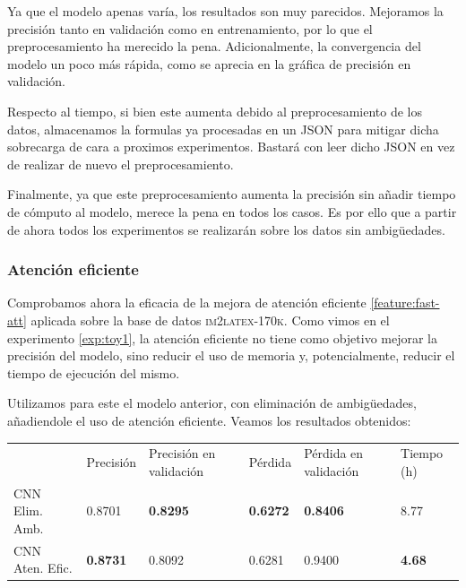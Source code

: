 \documentclass[a4paper, 20pt, dvipsnames]{article}
\begin{document}
Ya que el modelo apenas varía, los resultados son muy parecidos. Mejoramos la
precisión tanto en validación como en entrenamiento, por lo que el preprocesamiento
ha merecido la pena. Adicionalmente, la convergencia del modelo un poco más rápida,
como se aprecia en la gráfica de precisión en validación.

Respecto al tiempo, si bien este aumenta debido al preprocesamiento de los datos,
almacenamos la formulas ya procesadas en un JSON para mitigar dicha sobrecarga de
cara a proximos experimentos. Bastará con leer dicho JSON en vez de realizar de
nuevo el preprocesamiento.

Finalmente, ya que este preprocesamiento aumenta la precisión sin añadir tiempo de
cómputo al modelo, merece la pena en todos los casos. Es por ello que a partir de
ahora todos los experimentos se realizarán sobre los datos sin ambigüedades.

\subsubsection{Atención eficiente}
\label{exp:3a}

Comprobamos ahora la eficacia de la mejora de atención eficiente
\ref{feature:fast-att} aplicada sobre la base de datos
\textsc{im2latex-170k}. Como vimos en el experimento \ref{exp:toy1}, la atención
eficiente no tiene como objetivo mejorar la precisión del modelo, sino reducir
el uso de memoria y, potencialmente, reducir el tiempo de ejecución del mismo.

Utilizamos para este el modelo anterior, con eliminación de ambigüedades,
añadiendole el uso de atención eficiente. Veamos los resultados obtenidos:

\begin{table}[H]
	\centering
	\begin{tabular}{llllll}
		& Precisión       & Precisión en validación & Pérdida         & Pérdida en validación & Tiempo (h)    \\ \cline{2-6} 
		CNN Elim. Amb.  & 0.8701          & \textbf{0.8295}         & \textbf{0.6272} & \textbf{0.8406}       & 8.77          \\
		CNN Aten. Efic. & \textbf{0.8731} & 0.8092                  & 0.6281          & 0.9400                & \textbf{4.68}
	\end{tabular}
\end{table}
\end{document}
